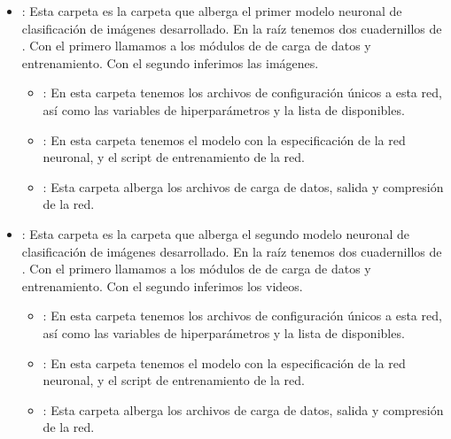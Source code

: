 \begin{itemize}
\begin{itemize}
\begin{itemize}
                  \item {}: Esta carpeta es la carpeta que alberga el primer modelo neuronal de clasificación de imágenes desarrollado. En la raíz tenemos dos cuadernillos de . Con el primero llamamos a los módulos de  de carga de datos y entrenamiento. Con el segundo inferimos las imágenes.
                        \begin{itemize}
                          \item {}: En esta carpeta tenemos los archivos de configuración únicos a esta red, así como las variables de hiperparámetros y la lista de  disponibles.
                          \item {}: En esta carpeta tenemos el modelo con la especificación de la red neuronal, y el script de entrenamiento de la red.
                          \item {}: Esta carpeta alberga los archivos de carga de datos, salida y compresión de la red.
                        \end{itemize}

                  \item {}: Esta carpeta es la carpeta que alberga el segundo modelo neuronal de clasificación de imágenes desarrollado. En la raíz tenemos dos cuadernillos de . Con el primero llamamos a los módulos de  de carga de datos y entrenamiento. Con el segundo inferimos los videos.
                        \begin{itemize}
                          \item {}: En esta carpeta tenemos los archivos de configuración únicos a esta red, así como las variables de hiperparámetros y la lista de  disponibles.
                          \item {}: En esta carpeta tenemos el modelo con la especificación de la red neuronal, y el script de entrenamiento de la red.
                          \item {}: Esta carpeta alberga los archivos de carga de datos, salida y compresión de la red.
                        \end{itemize}


\end{itemize}
\end{itemize}
\end{itemize}
